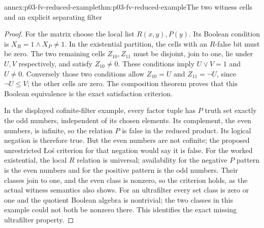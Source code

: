 \begin{annexitem}{annex:p03-fv-reduced-example}{thm:p03-fv-reduced-example}{The two witness cells and an explicit separating filter}
\begin{proof}
For the matrix choose the local list \(R(x,y),P(y)\). Its Boolean
condition is \(X_R=1\land X_P\ne1\). In the existential partition,
the cells with an \(R\)-false bit must be zero. The two remaining cells
\(Z_{10},Z_{11}\) must be disjoint, join to one, lie under \(U,V\)
respectively, and satisfy \(Z_{10}\ne0\). These conditions imply
\(U\vee V=1\) and \(U\ne0\). Conversely those two conditions allow
\(Z_{10}=U\) and \(Z_{11}=\neg U\), since \(\neg U\le V\);
the other cells are zero. The composition theorem proves that this Boolean
equivalence is the exact satisfaction criterion.

In the displayed cofinite-filter example, every factor tuple has \(P\)
truth set exactly the odd numbers, independent of its chosen elements.
Its complement, the even numbers, is infinite, so the relation \(P\)
is false in the reduced product. Its logical negation is therefore true.
But the even numbers are not cofinite; the proposed unrestricted \L o\'s
criterion for that negation would say it is false. For the worked existential,
the local \(R\) relation is universal; availability for the negative
\(P\) pattern is the even numbers and for the positive pattern is the
odd numbers. Their classes join to one, and the even class is nonzero,
so the criterion holds, as the actual witness semantics also shows.
For an ultrafilter every set class is zero or one and the quotient Boolean
algebra is nontrivial; the two classes in this example could not both be
nonzero there. This identifies the exact missing ultrafilter property.
\end{proof}
\end{annexitem}

